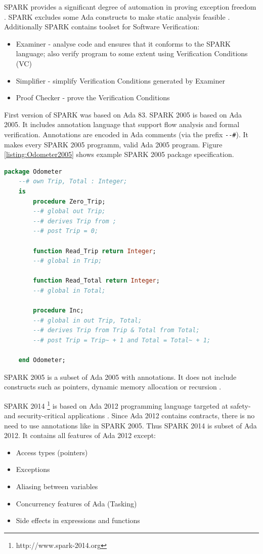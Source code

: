SPARK provides a significant degree of automation in proving exception freedom \cite{Spark:Article}. SPARK excludes some Ada constructs to make static analysis feasible \cite{Spark:Article}. Additionally SPARK contains toolset for Software Verification:
\begin{itemize} \itemsep1pt \parskip0pt 
	\item Examiner - analyse code and ensures that it conforms to the SPARK language; also verify program to some extent using Verification Conditions (VC)
	\item Simplifier - simplify Verification Conditions generated by Examiner
	\item Proof Checker - prove the Verification Conditions
\end{itemize}

First version of SPARK was based on Ada 83. SPARK 2005 is based on Ada 2005. It includes annotation language that support flow analysis and formal verification. Annotations are encoded in Ada comments (via the prefix \lstinline{--#}). It makes every SPARK 2005 programm, valid Ada 2005 program. Figure \ref{listing:Odometer2005} shows example SPARK 2005 package specification.

\begin{lstlisting}[language=ada, frame=single, gobble=0, caption={SPARK 2005 code: Odometer \cite{Barnes:Book}}, label={listing:Odometer2005}]
	package Odometer
	--# own Trip, Total : Integer;
	is
		procedure Zero_Trip;
		--# global out Trip;
		--# derives Trip from ;
		--# post Trip = 0;

		function Read_Trip return Integer;
		--# global in Trip;

		function Read_Total return Integer;
		--# global in Total;

		procedure Inc;
		--# global in out Trip, Total;
		--# derives Trip from Trip & Total from Total;
		--# post Trip = Trip~ + 1 and Total = Total~ + 1;

	end Odometer;
\end{lstlisting} 

SPARK 2005 is a subset of Ada 2005 with annotations. It does not include constructs such as pointers, dynamic memory allocation or recursion \cite{Spark:Article}.

SPARK 2014 \footnote{http://www.spark-2014.org} is based on Ada 2012 programming language targeted at safety- and security-critical applications \cite{Spark2014:Paper}. Since Ada 2012 contains contracts, there is no need to use annotations like in SPARK 2005. Thus SPARK 2014 is subset of Ada 2012. It contains all features of Ada 2012 except:
\begin{itemize} \itemsep1pt \parskip0pt 
 	\item Access types (pointers)
 	\item Exceptions
	\item Aliasing between variables
	\item Concurrency features of Ada (Tasking)
	\item Side effects in expressions and functions
\end{itemize}

